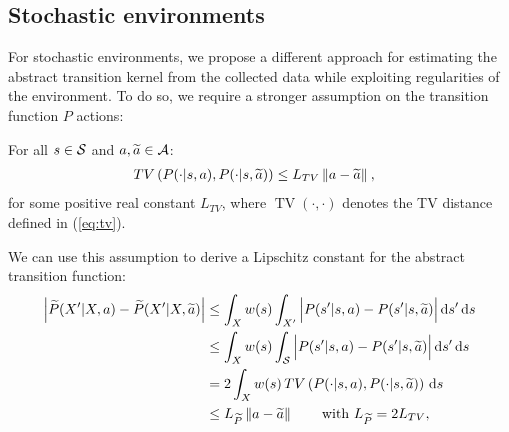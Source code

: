 \subsection{Stochastic environments}\label{sec:app2.3}
For stochastic environments, we propose a different approach for estimating the abstract transition kernel from the collected data while exploiting regularities of the environment. To do so, we require a stronger assumption on the transition function $P$ \wrt actions:
%
\begin{assumption}\label{ass:lipmdp2}
	For all $s\in\mathcal{S}$ and $a,\widetilde{a}\in\mathcal{A}$:
	\begin{align}
	&\mathop{TV}\left(P(\cdot|s,a), P(\cdot| s,\widetilde{a})\right) \leq L_{TV}\left\|a - \widetilde{a}\right\|_{},
	\end{align}
	for some positive real constant $L_{TV}$, where $\mathop{TV}(\cdot,\cdot)$ denotes the \acf{TV} distance defined in (\ref{eq:tv}).
\end{assumption}
%
\noindent We can use this assumption to derive a Lipschitz constant for the abstract transition function:
\begin{align}
\Big|\widetilde{P}(X'|X,a) - \widetilde{P}(X'|X,\widetilde{a})\Big| &\leq \int_{X} w(s) \int_{X'} \Big|P(s'|s,a) - P(s'|s,\widetilde{a})\Big| \,\mathrm{d} s' \,\mathrm{d} s \nonumber\\
&\leq \int_{X}w(s)\int_{\mathcal{S}} \Big|P(s'|s,a) - P(s'|s,\widetilde{a})\Big| \,\mathrm{d} s' \,\mathrm{d} s \label{p:24} \\
&= 2\int_{X}w(s)\mathop{TV}\left(P(\cdot|s,a), P(\cdot|s,\widetilde{a})\right)\,\mathrm{d} s\label{p:33}\\
&\leq L_{\widetilde{P}}\left\|a-\widetilde{a}\right\|_{}\qquad\text{with $L_{\widetilde{P}}=2L_{TV}$}\label{p:27},
\end{align}
